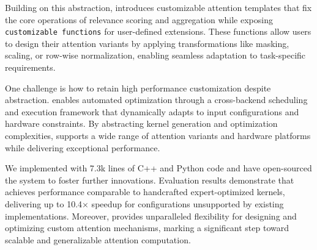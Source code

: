 Building on this abstraction, \oursys{} introduces customizable attention templates that fix the core operations of relevance scoring and aggregation while exposing \texttt{customizable functions} for user-defined extensions. These functions allow users to design their attention variants by applying transformations like masking, scaling, or row-wise normalization, enabling seamless adaptation to task-specific requirements.


One challenge is how to retain high performance customization despite abstraction. \oursys{} enables automated optimization through a cross-backend scheduling and execution framework that dynamically adapts to input configurations and hardware constraints. By abstracting kernel generation and optimization complexities, \oursys{} supports a wide range of attention variants and hardware platforms while delivering exceptional performance.



We implemented \oursys{} with 7.3k lines of C++ and Python code and have open-sourced the system to foster further innovations. Evaluation results demonstrate that \oursys{} achieves performance comparable to handcrafted expert-optimized kernels, delivering up to 10.4× speedup for configurations unsupported by existing implementations. Moreover, \oursys{} provides unparalleled flexibility for designing and optimizing custom attention mechanisms, marking a significant step toward scalable and generalizable attention computation.



